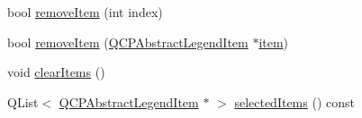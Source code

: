 \begin{DoxyCompactItemize}
\item 
bool \mbox{\hyperlink{class_q_c_p_legend_ac91595c3eaa746fe6321d2eb952c63bb}{remove\+Item}} (int index)
\item 
bool \mbox{\hyperlink{class_q_c_p_legend_a2aea4ec6da2d454dd0b241a254d65082}{remove\+Item}} (\mbox{\hyperlink{class_q_c_p_abstract_legend_item}{Q\+C\+P\+Abstract\+Legend\+Item}} $\ast$\mbox{\hyperlink{class_q_c_p_legend_acfe9694c45104a3359d3806ed366fcf7}{item}})
\item 
void \mbox{\hyperlink{class_q_c_p_legend_a24795c7250eb5214fcea16b7217b4dfb}{clear\+Items}} ()
\item 
Q\+List$<$ \mbox{\hyperlink{class_q_c_p_abstract_legend_item}{Q\+C\+P\+Abstract\+Legend\+Item}} $\ast$ $>$ \mbox{\hyperlink{class_q_c_p_legend_ac7d9e567d5c551e09cd9bcc4306c5532}{selected\+Items}} () const
\end{DoxyCompactItemize}
